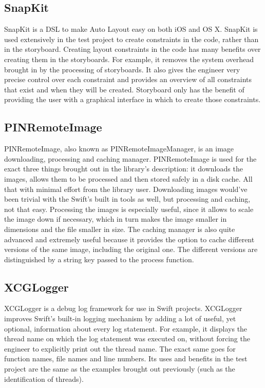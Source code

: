 \documentclass[a4paper,12pt]{article}
\begin{document}
\subsection{SnapKit}
SnapKit is a DSL to make Auto Layout easy on both iOS and OS X.\cite{SnapKit} SnapKit is used extensively in the test project to create constraints in the code, rather than in the storyboard. Creating layout constraints in the code has many benefits over creating them in the storyboards. For example, it removes the system overhead brought in by the processing of storyboards. It also gives the engineer very precise control over each constraint and provides an overview of all constraints that exist and when they will be created. Storyboard only has the benefit of providing the user with a graphical interface in which to create those constraints.

\subsection{PINRemoteImage}
PINRemoteImage, also known as PINRemoteImageManager, is an image downloading, processing and caching manager.\cite{PINRemoteImage} PINRemoteImage is used for the exact three things brought out in the library's description: it downloads the images, allows them to be processed and then stored safely in a disk cache. All that with minimal effort from the library user. Downloading images would've been trivial with the Swift's built in tools as well, but processing and caching, not that easy. Processing the images is especially useful, since it allows to scale the image down if necessary, which in turn makes the image smaller in dimensions and the file smaller in size. The caching manager is also quite advanced and extremely useful because it provides the option to cache different versions of the same image, including the original one. The different versions are distinguished by a string key passed to the process function.

\subsection{XCGLogger}
XCGLogger is a debug log framework for use in Swift projects.\cite{XCGLogger} XCGLogger improves Swift's built-in logging mechanism by adding a lot of useful, yet optional, information about every log statement. For example, it displays the thread name on which the log statement was executed on, without forcing the engineer to explicitly print out the thread name. The exact same goes for function names, file names and line numbers. Its uses and benefits in the test project are the same as the examples brought out previously (such as the identification of threads).
\end{document}
